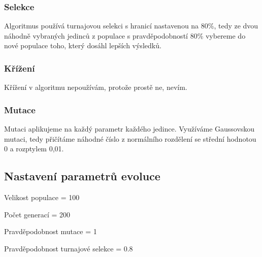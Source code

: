 \subsubsection*{Selekce}
Algoritmus používá turnajovou selekci s hranicí nastavenou na 80\%, tedy ze dvou náhodně vybraných jedinců z populace s pravděpodobností 80\% vybereme do nové populace toho, který dosáhl lepších výsledků.
\subsubsection*{Křížení}
Křížení v algoritmu nepoužívám, protože prostě ne, nevím.
\subsubsection*{Mutace}
Mutaci aplikujeme na každý parametr každého jedince. Využíváme Gaussovskou mutaci, tedy přičítáme náhodné číslo z normálního rozdělení se střední hodnotou 0 a rozptylem 0,01.

\subsection{Nastavení parametrů evoluce}

Velikost populace = 100

Počet generací = 200

Pravděpodobnost mutace = 1

Pravděpodobnost turnajové selekce = 0.8




